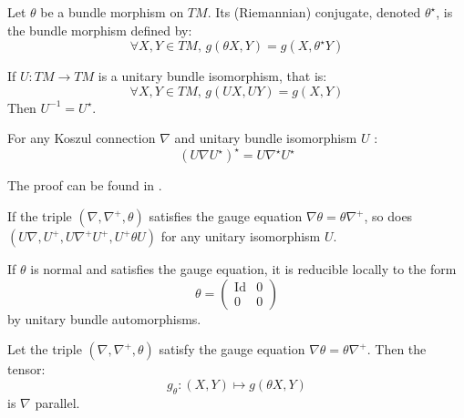 \begin{defn}
\label{def:endo_conjugate}
Let $\theta$ be a bundle morphism on $TM.$ Its (Riemannian) conjugate,
denoted $\theta^\star$, is the bundle morphism defined by:
\begin{equation}
    \label{eq:endo_conjugate}
    \forall X,Y \in TM, \, g\left( \theta X, Y\right) = 
    g\left( X, \theta^\star Y\right)
\end{equation}
\end{defn}
\begin{prop}
\label{prop:inverse_unitary}
If $U \colon TM \to TM$ is a unitary bundle isomorphism, that is:
\[
\forall X,Y \in TM, \, g\left( UX, UY \right) = g(X,Y)
\]
Then $U^{-1} = U^\star.$
\end{prop}

\begin{prop}
\label{prop:unitary_conjugate}
For any Koszul connection $\nabla$ and unitary bundle isomorphism $U$ :
\begin{equation}
\label{eq:unitary_conjugate}
\left(U \nabla U^\star\right)^\star = U \nabla^\star U^\star
\end{equation}
\end{prop}
The proof can be found in \cite{boyom2024}.
\begin{prop}
\label{prop:unitary_conjugate_gauge}
If the triple $\left(\nabla,\nabla^+,\theta \right)$ satisfies the gauge equation $\nabla \theta = \theta \nabla^+$, so does  $\left(U \nabla, U^+, U \nabla^+ U^+, U^+ \theta U\right)$ for any unitary isomorphism $U.$
\end{prop}
\begin{rem}
If $\theta$ is normal and satisfies the gauge equation, it is reducible locally to the form
\begin{equation}
    \label{eq:reduced_normal_theta}
    \theta = \left( \begin{array}{c|c} \text{Id} & 0 \\ \hline
    0 & 0
    \end{array} \right)
\end{equation}
by unitary bundle automorphisms.
\end{rem}
\begin{prop}
\label{prop:parallel_g_tensor}
Let the triple $\left(\nabla,\nabla^+,\theta \right)$ satisfy the gauge equation $\nabla \theta = \theta \nabla^+.$ Then the tensor:
\begin{equation}
    \label{eq:parallel_g_tensor}
    g_\theta \colon (X,Y) \mapsto g\left( \theta X, Y\right)
\end{equation}
is $\nabla$ parallel.
\end{prop}

